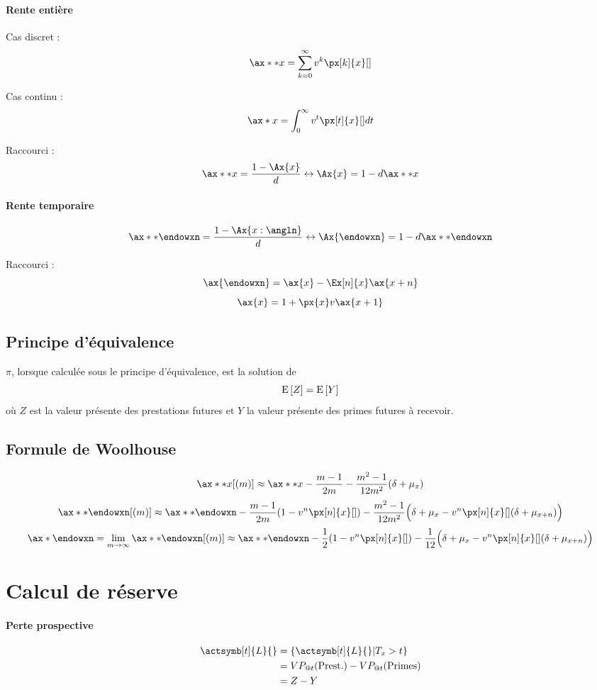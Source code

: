 \documentclass[10pt, french]{article}
\begin{document}
\begin{multicols*}{2}
\paragraph{Rente entière} Cas discret : 
\[\ax**{x} = \sum_{k=0}^{\infty} v^{k} \px[k]{x}[]  \]

Cas continu : 
\[\ax*{x} = \int_{0}^{\infty}  v^t \px[t]{x}[] dt \]

Raccourci : 
\[\ax**{x} = \frac{1 - \Ax{x}}{d} \leftrightarrow \Ax{x} = 1 - d \ax**{x}\]

\paragraph{Rente temporaire}
\[\ax**{\endowxn} = \frac{1 - \Ax{x:\angln}}{d} \leftrightarrow \Ax{\endowxn} =1 - d \ax**{\endowxn}\]

Raccourci : 
\[\ax{\endowxn} = \ax{x} - \Ex[n]{x} \ax{x+n}  \]
\[\ax{x} = 1 + \px{x} v \ax{x+1}\]




\subsection*{Principe d'équivalence}
$\pi$, lorsque calculée sous le principe d'équivalence, est la solution de
\[\mathrm{E} \left[ Z \right] = \mathrm{E} \left[ Y \right]\]
où $Z$ est la valeur présente des prestations futures et $Y$ la valeur présente des primes futures à recevoir.

\subsection*{Formule de Woolhouse}
\[\ax**{x}[(m)] \approx \ax**{x} - \frac{m-1}{2m} - \frac{m^2 -1}{12m^2} (\delta + \mu_x)  \]
\[\ax**{\endowxn}[(m)] \approx  \ax**{\endowxn} - \frac{m-1}{2m}(1  -v^n \px[n]{x}[]) - \frac{m^2 -1}{12m^2} \Big( \delta + \mu_x - v^n \px[n]{x}[](\delta + \mu_{x+n}) \Big)  \]
\[\ax*{\endowxn} = \lim_{m \to \infty}  \ax**{\endowxn}[(m)] \approx  \ax**{\endowxn} - \frac{1}{2} (1  -v^n \px[n]{x}[]) - \frac{1}{12} \Big( \delta + \mu_x - v^n \px[n]{x}[](\delta + \mu_{x+n}) \Big)  \]



\section{Calcul de réserve}
\paragraph{Perte prospective}
\begin{align*}
\actsymb[t]{L}{} & = \{ \actsymb[t]{L}{} | T_x > t \} \\
& = VP_{@t}(\text{Prest.}) - VP_{@t}(\text{Primes}) \\
& = Z - Y
\end{align*}


\end{multicols*}
\end{document}
